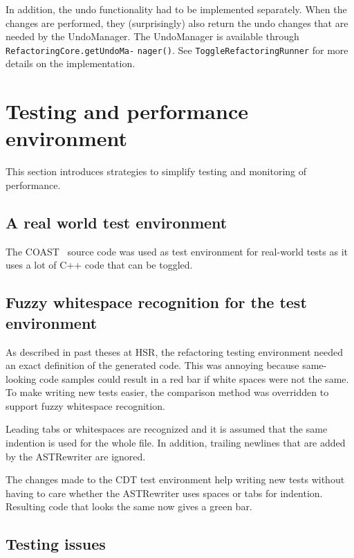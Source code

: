 In addition, the undo functionality had to be implemented separately. When the 
changes are performed, they (surprisingly) also return the undo changes that are 
needed by the UndoManager. The UndoManager is available through 
\texttt{RefactoringCore.getUndoMa-} \newline
\texttt{nager()}. See \texttt{ToggleRefactoringRunner} 
for more details on the implementation.

\section{Testing and performance environment}

This section introduces strategies to simplify testing and monitoring of 
performance.

\subsection{A real world test environment}
The COAST~\cite{COAST} source code was used as test environment for real-world 
tests as it uses a lot of C++ code that can be toggled.

\subsection[Fuzzy whitespace recognition for the tests]{Fuzzy whitespace 
recognition for the test environment}

As described in past theses at HSR, the refactoring testing environment
needed an exact definition of the generated code. This was annoying because
same-looking code samples could result in a red bar if white spaces were not the
same. To make writing new tests easier, the comparison method was overridden to
support fuzzy whitespace recognition.

Leading tabs or whitespaces are recognized and it is assumed that the same
indention is used for the whole file. In addition, trailing newlines that are
added by the ASTRewriter are ignored.

The changes made to the CDT test environment help writing new tests without
having to care whether the ASTRewriter uses spaces or tabs for indention.
Resulting code that looks the same now gives a green bar.

\subsection{Testing issues}

